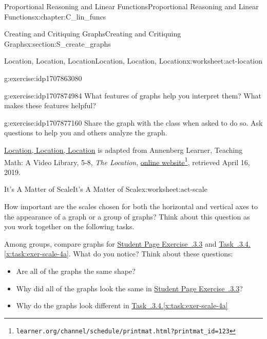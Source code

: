 \documentclass[oneside,10pt,]{book}
\newcommand{\xreffont}{\relax}
\newcommand{\pubtitle}[1]{\textsl{#1}}
\numberwithin{equation}{chapter}
\begin{document}
\begin{chapterptx}{Proportional Reasoning and Linear Functions}{}{Proportional Reasoning and Linear Functions}{}{}{x:chapter:C_lin_funcs}
\begin{sectionptx}{Creating and Critiquing Graphs}{}{Creating and Critiquing Graphs}{}{}{x:section:S_create_graphs}
\begin{worksheet-subsection}{Location, Location, Location}{}{Location, Location, Location}{}{}{x:worksheet:act-location}
\begin{divisionexercise}{4}{}{}{g:exercise:idp1707863080}
\end{divisionexercise}%
\begin{divisionexercise}{5}{}{}{g:exercise:idp1707874984}%
What features of graphs help you interpret them? What makes these features helpful?%
\end{divisionexercise}%
\begin{divisionexercise}{6}{}{}{g:exercise:idp1707877160}%
Share the graph with the class when asked to do so. Ask questions to help you and others analyze the graph.%
\end{divisionexercise}%
\begin{conclusion}{}%
\hyperref[x:worksheet:act-location]{Location, Location, Location} is adapted from Annenberg Learner, Teaching Math: A Video Library, 5-8, \pubtitle{The Location}, \href{http://www.learner.org/channel/schedule/printmat.html?printmat_id=123}{online website}\footnote{\nolinkurl{learner.org/channel/schedule/printmat.html?printmat_id=123}\label{g:fn:idp1707869736}}, retrieved April 16, 2019.%
\end{conclusion}%
\end{worksheet-subsection}
\restoregeometry
%
%
\typeout{************************************************}
\typeout{************************************************}
%
\begin{worksheet-subsection}{It's A Matter of Scale}{}{It's A Matter of Scale}{}{}{x:worksheet:act-scale}
\begin{introduction}{}%
How important are the scales chosen for both the horizontal and vertical axes to the appearance of a graph or a group of graphs? Think about this question as you work together on the following tasks.%
\par
Among groups, compare graphs for \hyperlink{x:exercise:exer-scale-3}{Student Page Exercise~{\xreffont 2.2.3.3}} and \hyperref[x:task:exer-scale-4a]{Task~{\xreffont 2.2.3.4}.{\xreffont\ref{x:task:exer-scale-4a}}}. What do you notice? Think about these questions:%
\begin{itemize}[label=\textbullet]
\item{}Are all of the graphs the same shape?%
\item{}Why did all of the graphs look the same in \hyperlink{x:exercise:exer-scale-3}{Student Page Exercise~{\xreffont 2.2.3.3}}?%
\item{}Why do the graphs look different in \hyperref[x:task:exer-scale-4a]{Task~{\xreffont 2.2.3.4}.{\xreffont\ref{x:task:exer-scale-4a}}}%

\end{itemize}
\end{introduction}
\end{worksheet-subsection}
\end{sectionptx}
\end{chapterptx}
\end{document}
